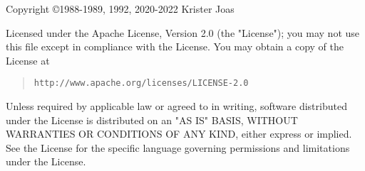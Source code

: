 Copyright \copyright 1988-1989, 1992, 2020-2022 Krister Joas

Licensed under the Apache License, Version 2.0 (the "License"); you
may not use this file except in compliance with the License.  You may
obtain a copy of the License at

\begin{quotation}
\texttt{http://www.apache.org/licenses/LICENSE-2.0}
\end{quotation}

Unless required by applicable law or agreed to in writing, software
distributed under the License is distributed on an "AS IS" BASIS,
WITHOUT WARRANTIES OR CONDITIONS OF ANY KIND, either express or
implied.  See the License for the specific language governing
permissions and limitations under the License.
